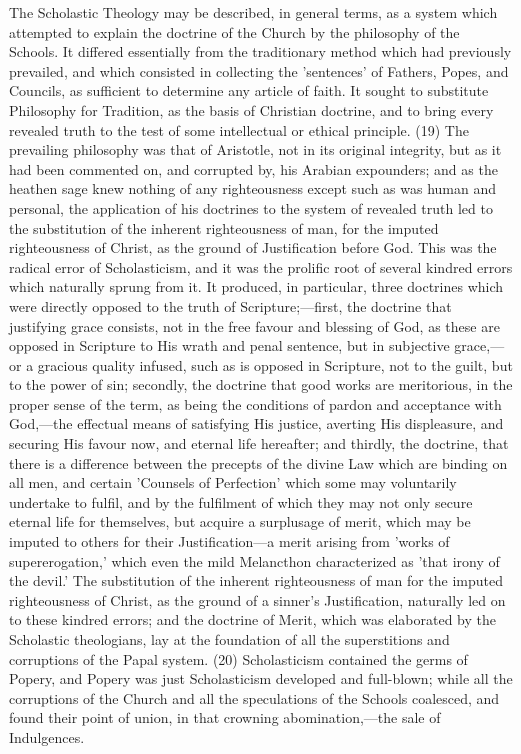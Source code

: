 \documentclass[
]{book}
\begin{document}
The Scholastic Theology may be described, in general terms, as a system which attempted to explain the doctrine of the Church by the philosophy of the Schools. It differed essentially from the traditionary method which had previously prevailed, and which consisted in collecting the 'sentences' of Fathers, Popes, and Councils, as sufficient to determine any article of faith. It sought to substitute Philosophy for Tradition, as the basis of Christian doctrine, and to bring every revealed truth to the test of some intellectual or ethical principle. (19) The prevailing philosophy was that of Aristotle, not in its original integrity, but as it had been commented on, and corrupted by, his Arabian expounders; and as the heathen sage knew nothing of any righteousness except such as was human and personal, the application of his doctrines to the system of revealed truth led to the substitution of the inherent righteousness of man, for the imputed righteousness of Christ, as the ground of Justification before God. This was the radical error of Scholasticism, and it was the prolific root of several kindred errors which naturally sprung from it. It produced, in particular, three doctrines which were directly opposed to the truth of Scripture;---first, the doctrine that justifying grace consists, not in the free favour and blessing of God, as these are opposed in Scripture to His wrath and penal sentence, but in subjective grace,---or a gracious quality infused, such as is opposed in Scripture, not to the guilt, but to the power of sin; secondly, the doctrine that good works are meritorious, in the proper sense of the term, as being the conditions of pardon and acceptance with God,---the effectual means of satisfying His justice, averting His displeasure, and securing His favour now, and eternal life hereafter; and thirdly, the doctrine, that there is a difference between the precepts of the divine Law which are binding on all men, and certain 'Counsels of Perfection' which some may voluntarily undertake to fulfil, and by the fulfilment of which they may not only secure eternal life for themselves, but acquire a surplusage of merit, which may be imputed to others for their Justification---a merit arising from 'works of supererogation,' which even the mild Melancthon characterized as 'that irony of the devil.' The substitution of the inherent righteousness of man for the imputed righteousness of Christ, as the ground of a sinner's Justification, naturally led on to these kindred errors; and the doctrine of Merit, which was elaborated by the Scholastic theologians, lay at the foundation of all the superstitions and corruptions of the Papal system. (20) Scholasticism contained the germs of Popery, and Popery was just Scholasticism developed and full-blown; while all the corruptions of the Church and all the speculations of the Schools coalesced, and found their point of union, in that crowning abomination,---the sale of Indulgences.
\end{document}
